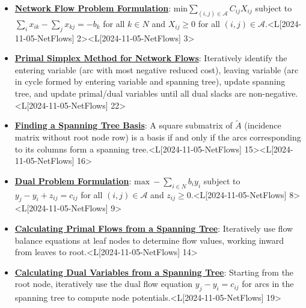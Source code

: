 \documentclass{article}%
\begin{document}
\begin{itemize}[[leftmargin=*]]%
\item \href{https://www.math.purdue.edu/~yipn/421/2024-11-05-NetFlows.pdf#page=2}{\textbf{Network Flow Problem Formulation}}: $\text{min} \sum_{(i,j) \in \mathcal{A}} C_{ij} X_{ij}$ subject to $\sum_{i} x_{ik} - \sum_{j} x_{kj} = -b_k$ for all $k \in N$ and $X_{ij} \ge 0$ for all $(i,j) \in \mathcal{A}$.<L[2024-11-05-NetFlows] 2><L[2024-11-05-NetFlows] 3>%
\item \href{https://www.math.purdue.edu/~yipn/421/2024-11-05-NetFlows.pdf#page=22}{\textbf{Primal Simplex Method for Network Flows}}: Iteratively identify the entering variable (arc with most negative reduced cost), leaving variable (arc in cycle formed by entering variable and spanning tree), update spanning tree, and update primal/dual variables until all dual slacks are non-negative.<L[2024-11-05-NetFlows] 22>%
\item \href{https://www.math.purdue.edu/~yipn/421/2024-11-05-NetFlows.pdf#page=15}{\textbf{Finding a Spanning Tree Basis}}: A square submatrix of $\tilde{A}$ (incidence matrix without root node row) is a basis if and only if the arcs corresponding to its columns form a spanning tree.<L[2024-11-05-NetFlows] 15><L[2024-11-05-NetFlows] 16>%
\item \href{https://www.math.purdue.edu/~yipn/421/2024-11-05-NetFlows.pdf#page=8}{\textbf{Dual Problem Formulation}}: $\text{max} \ -\sum_{i \in N} b_i y_i$ subject to $y_j - y_i + z_{ij} = c_{ij}$ for all $(i,j) \in \mathcal{A}$ and $z_{ij} \ge 0$.<L[2024-11-05-NetFlows] 8><L[2024-11-05-NetFlows] 9>%
\item \href{https://www.math.purdue.edu/~yipn/421/2024-11-05-NetFlows.pdf#page=14}{\textbf{Calculating Primal Flows from a Spanning Tree}}: Iteratively use flow balance equations at leaf nodes to determine flow values, working inward from leaves to root.<L[2024-11-05-NetFlows] 14>%
\item \href{https://www.math.purdue.edu/~yipn/421/2024-11-05-NetFlows.pdf#page=19}{\textbf{Calculating Dual Variables from a Spanning Tree}}: Starting from the root node, iteratively use the dual flow equation $y_j - y_i = c_{ij}$ for arcs in the spanning tree to compute node potentials.<L[2024-11-05-NetFlows] 19>%
\end{itemize}%
\end{document}
